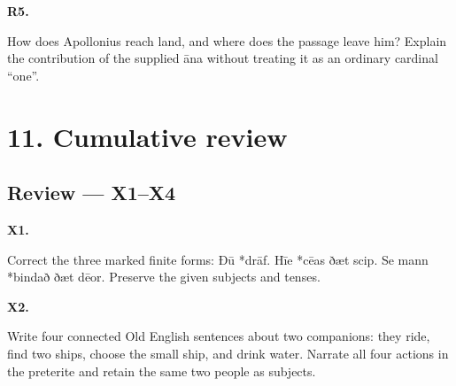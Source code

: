 \par\begin{minipage}{\linewidth}\raggedright
\textbf{R5.}

How does Apollonius reach land, and where does the passage leave him? Explain the contribution of the supplied āna without treating it as an ordinary cardinal “one”.

\end{minipage}\par\addvspace{4pt}

\section*{11. Cumulative review}

\subsection*{Review — X1–X4}

\par\begin{minipage}{\linewidth}\raggedright
\textbf{X1.}

Correct the three marked finite forms: Ðū *drāf. Hīe *cēas ðæt scip. Se mann *bindað ðæt dēor. Preserve the given subjects and tenses.

\end{minipage}\par\addvspace{4pt}

\par\begin{minipage}{\linewidth}\raggedright
\textbf{X2.}

Write four connected Old English sentences about two companions: they ride, find two ships, choose the small ship, and drink water. Narrate all four actions in the preterite and retain the same two people as subjects.

\end{minipage}\par\addvspace{4pt}

